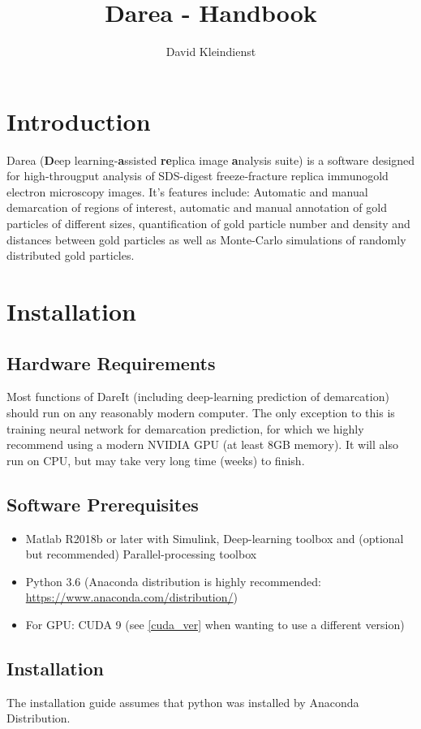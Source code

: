 \documentclass[12pt, a4paper]{scrartcl}
\author{David Kleindienst}
\title{Darea - Handbook}
\begin{document}
\maketitle
\section{Introduction}
Darea (\textbf{D}eep learning-\textbf{a}ssisted \textbf{re}plica image \textbf{a}nalysis suite) is a software designed for high-througput analysis of SDS-digest freeze-fracture replica immunogold electron microscopy images. It's features include: Automatic and manual demarcation of regions of interest, automatic and manual annotation of gold particles of different sizes, quantification of gold particle number and density and distances between gold particles as well as Monte-Carlo simulations of randomly distributed gold particles.

\tableofcontents
\section{Installation}
\subsection{Hardware Requirements}
Most functions of DareIt (including deep-learning prediction of demarcation) should run on any reasonably modern computer. The only exception to this is training neural network for demarcation prediction, for which we highly recommend using a modern NVIDIA GPU (at least 8GB memory). It will also run on CPU, but may take very long time (weeks) to finish.
\subsection{Software Prerequisites}
\begin{itemize}
\item Matlab R2018b or later with Simulink, Deep-learning toolbox and (optional but recommended) Parallel-processing toolbox
\item Python 3.6 (Anaconda distribution is highly recommended: \url{https://www.anaconda.com/distribution/})
\item For GPU: CUDA 9 (see \ref{cuda_ver} when wanting to use a different version)
\end{itemize}
\subsection{Installation}
The installation guide assumes that python was installed by Anaconda Distribution.
\end{document}

